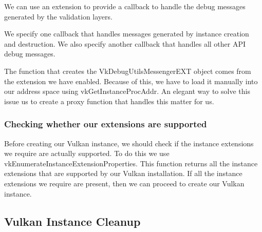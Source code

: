 We can use an extension to provide a callback to handle the debug messages
generated by the validation layers.

\begin{minipage}{\linewidth}{\noindent}
    
\end{minipage}

We specify one callback that handles messages generated by
instance creation and destruction.
We also specify another callback that handles all other API debug messages.

\begin{minipage}{\linewidth}{\noindent}
    
\end{minipage}

The function that creates the VkDebugUtilsMessengerEXT object comes from the
extension we have enabled.
Because of this, we have to load it manually into our address space using
vkGetInstanceProcAddr.
An elegant way to solve this issue us to create a proxy function that handles
this matter for us.

\begin{minipage}{\linewidth}{\noindent}
    
\end{minipage}

\subsubsection{Checking whether our extensions are supported}

Before creating our Vulkan instance, we should check if the instance extensions
we require are actually supported.
To do this we use vkEnumerateInstanceExtensionProperties.
This function returns all the instance extensions that are supported by our
Vulkan installation.
If all the instance extensions we require are present, then we can proceed to
create our Vulkan instance.

\subsection{Vulkan Instance Cleanup}

